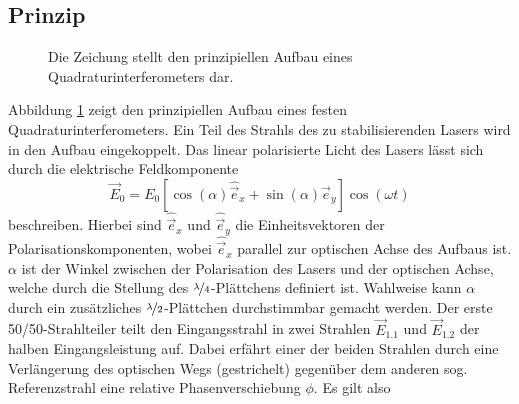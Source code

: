 \subsection{Prinzip}\label{subsec:quadraturinterferometer_prinzip}
\begin{figure}[h]
 	\centering
	\caption[Quadraturinterferometer - prinzipieller Aufbau]{Die
	Zeichung stellt den prinzipiellen Aufbau eines
	Quadraturinterferometers dar.}\label{fig:quadraturinterferometer_aufbau}
\end{figure}
Abbildung \ref{fig:quadraturinterferometer_aufbau} zeigt den prinzipiellen
Aufbau eines festen Quadraturinterferometers. Ein Teil des Strahls des zu stabilisierenden
Lasers wird in den Aufbau eingekoppelt. Das linear polarisierte
Licht des Lasers lässt sich durch die elektrische Feldkomponente
\begin{equation}\label{eq:quadraturinterfferometer_01}
	\vec{E}_0=E_0\left[\cos{(\alpha)}\hat{\vec{e}}_x+\sin{(\alpha)}\hat{\vec{e}}_y\right]\cos{(\omega
	t)}
\end{equation}
beschreiben. Hierbei sind $\hat{\vec{e}}_x$ und $\hat{\vec{e}}_y$ die
Einheitsvektoren der Polarisationskomponenten, wobei $\hat{\vec{e}}_x$ parallel
zur optischen Achse des Aufbaus ist. $\alpha$ ist der Winkel zwischen der
Polarisation des Lasers und der optischen Achse, welche durch die Stellung des
$\nicefrac{\lambda}{4}$-Plättchens definiert ist. Wahlweise kann $\alpha$ durch
ein zusätzliches $\nicefrac{\lambda}{2}$-Plättchen durchstimmbar gemacht werden.
Der erste 50/50-Strahlteiler teilt den Eingangsstrahl in zwei Strahlen
$\vec{E}_{1.1}$ und $\vec{E}_{1.2}$ der halben Eingangsleistung auf. Dabei erfährt einer der
beiden Strahlen durch eine Verlängerung des optischen Wegs (gestrichelt)
gegenüber dem anderen sog.
Referenzstrahl eine relative Phasenverschiebung $\phi$. Es gilt also
